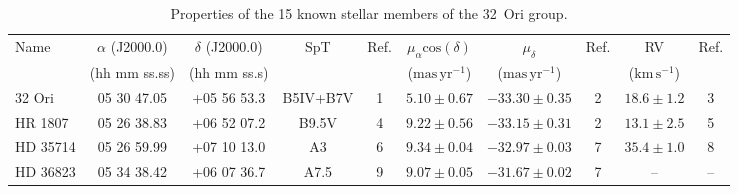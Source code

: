 \documentclass[usenatbib]{mnras}
\begin{document}
\begin{table*}
\caption[]{Properties of the 15 known stellar members of the 32~Ori group.}
\begin{tabular}{l c c c c c c c c c}
\hline
Name                    &   $\alpha$ (J2000.0)   &   $\delta$ (J2000.0)   &   SpT   &   Ref.   &   $\mu_{\alpha} \mathrm{cos} (\delta)$   &   $\mu_{\delta}$                       &   Ref.   &   RV                                        &   Ref.\\
                               &   (hh mm ss.ss)            &   (hh mm ss.s)             &              &             &   ($\mathrm{mas\,yr^{-1}}$)                       &   ($\mathrm{mas\,yr^{-1}}$)   &              &   ($\mathrm{km\,s^{-1}}$)   &   \\
\hline
32 Ori                     &   05 30 47.05               &   +05 56 53.3   &   B5IV+B7V    &   1   &   $5.10\pm0.67$                                           &   $-33.30\pm0.35$                 &   2        &   $18.6\pm1.2$                    &   3    \\
HR 1807                    &   05 26 38.83               &   +06 52 07.2   &   B9.5V           &   4   &   $9.22\pm0.56$                                          &   $-33.15\pm0.31$                  &   2        &   $13.1\pm2.5$                    &   5    \\
HD 35714                   &   05 26 59.99               &   +07 10 13.0   &   A3                 &   6   &   $9.34\pm0.04$                                          &   $-32.97\pm0.03$                  &   7        &   $35.4\pm1.0$                     &   8   \\
HD 36823                   &   05 34 38.42               &   +06 07 36.7   &   A7.5               &   9   &   $9.07\pm0.05$                                          &   $-31.67\pm0.02$                  &   7        &   --                                          &   --   \\

\end{tabular}
\end{table*}
\end{document}
